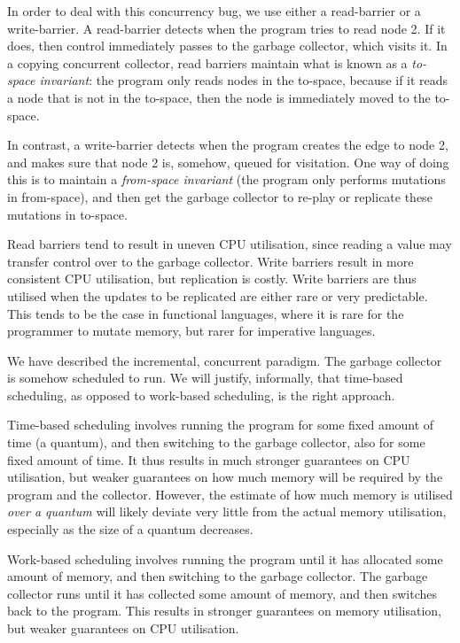 In order to deal with this concurrency bug, we use either a read-barrier or a write-barrier. A read-barrier detects when the program tries to read node 2. If it does, then control immediately passes to the garbage collector, which visits it. In a copying concurrent collector, read barriers maintain what is known as a \textit{to-space invariant}: the program only reads nodes in the to-space, because if it reads a node that is not in the to-space, then the node is immediately moved to the to-space.

In contrast, a write-barrier detects when the program creates the edge to node 2, and makes sure that node 2 is, somehow, queued for visitation. One way of doing this is to maintain a \textit{from-space invariant} (the program only performs mutations in from-space), and then get the garbage collector to re-play or replicate these mutations in to-space. 

Read barriers tend to result in uneven CPU utilisation, since reading a value may transfer control over to the garbage collector. Write barriers result in more consistent CPU utilisation, but replication is costly. Write barriers are thus utilised when the updates to be replicated are either rare or very predictable. This tends to be the case in functional languages, where it is rare for the programmer to mutate memory, but rarer for imperative languages.

We have described the incremental, concurrent paradigm. The garbage collector is somehow scheduled to run. We will justify, informally, that time-based scheduling, as opposed to work-based scheduling, is the right approach. 

Time-based scheduling involves running the program for some fixed amount of time (a quantum), and then switching to the garbage collector, also for some fixed amount of time. It thus results in much stronger guarantees on CPU utilisation, but weaker guarantees on how much memory will be required by the program and the collector. However, the estimate of how much memory is utilised \textit{over a quantum} will likely deviate very little from the actual memory utilisation, especially as the size of a quantum decreases. 

Work-based scheduling involves running the program until it has allocated some amount of memory, and then switching to the garbage collector. The garbage collector runs until it has collected some amount of memory, and then switches back to the program. This results in stronger guarantees on memory utilisation, but weaker guarantees on CPU utilisation.

